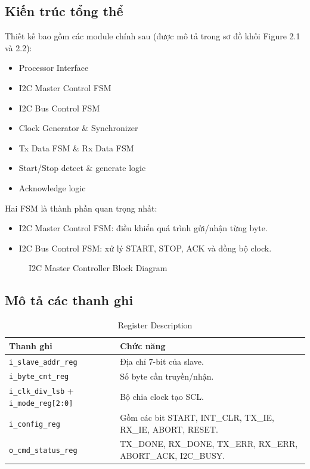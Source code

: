 \subsection{Kiến trúc tổng thể}
Thiết kế bao gồm các module chính sau (được mô tả trong sơ đồ khối Figure 2.1 và 2.2):
\begin{itemize}[leftmargin=1.2cm]
    \item Processor Interface
    \item I2C Master Control FSM
    \item I2C Bus Control FSM
    \item Clock Generator \& Synchronizer
    \item Tx Data FSM \& Rx Data FSM
    \item Start/Stop detect \& generate logic
    \item Acknowledge logic
\end{itemize}

Hai FSM là thành phần quan trọng nhất:
\begin{itemize}[leftmargin=1.2cm]
    \item I2C Master Control FSM: điều khiển quá trình gửi/nhận từng byte.
    \item I2C Bus Control FSM: xử lý START, STOP, ACK và đồng bộ clock.
\end{itemize}

\begin{figure}[H]
    \centering
    \caption{I2C Master Controller Block Diagram}
    \label{fig:block}
\end{figure}

\subsection{Mô tả các thanh ghi}
\begin{table}[H]
    \centering
    \caption{Register Description}
    \label{tab:reg}
    \begin{tabularx}{\textwidth}{|l|X|}
        \hline
        \textbf{Thanh ghi} & \textbf{Chức năng} \\
        \hline
        \texttt{i\_slave\_addr\_reg} & Địa chỉ 7-bit của slave. \\
        \hline
        \texttt{i\_byte\_cnt\_reg} & Số byte cần truyền/nhận. \\
        \hline
        \texttt{i\_clk\_div\_lsb} + \texttt{i\_mode\_reg[2:0]} & Bộ chia clock tạo SCL. \\
        \hline
        \texttt{i\_config\_reg} & Gồm các bit START, INT\_CLR, TX\_IE, RX\_IE, ABORT, RESET. \\
        \hline
        \texttt{o\_cmd\_status\_reg} & TX\_DONE, RX\_DONE, TX\_ERR, RX\_ERR, ABORT\_ACK, I2C\_BUSY. \\
        \hline
    \end{tabularx}
\end{table}

